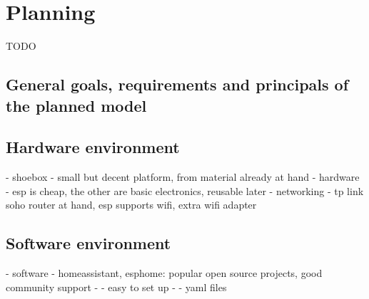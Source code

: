 \chapter{Planning}

TODO
\section{General goals, requirements and principals of the planned model}
\section{Hardware environment}
- shoebox - small but decent platform, from material already at hand
- hardware - esp is cheap, the other are basic electronics, reusable later
- networking - tp link soho router at hand, esp supports wifi, extra wifi adapter
\section{Software environment}
- software - homeassistant, esphome: popular open source projects, good community support
- - easy to set up
- - yaml files
